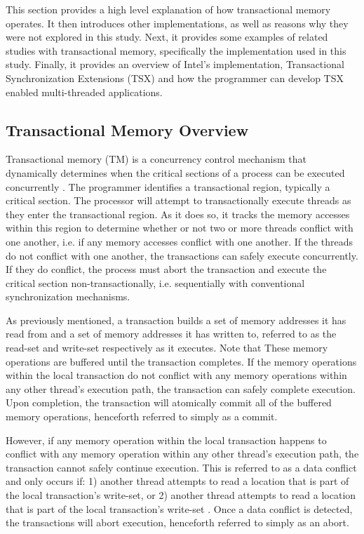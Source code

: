 \documentclass[a4paper]{article}
\begin{document}
\indent 
This section provides a high level explanation of how transactional
memory operates.  It then introduces other implementations, as well as reasons
why they were not explored in this study.  Next, it provides some examples of
related studies with transactional memory, specifically the implementation used
in this study. Finally, it provides an overview of Intel's implementation,
Transactional Synchronization Extensions (TSX) and how the programmer can
develop TSX enabled multi-threaded applications.
\par

\subsection{\textbf{Transactional Memory Overview}}

\indent
Transactional memory (TM) is a concurrency control mechanism that dynamically
determines when the critical sections of a process can be executed concurrently
\cite{sle_rajwar}.  The programmer identifies a transactional region, typically
a critical section.  The processor will attempt to transactionally execute
threads as they enter the transactional region.  As it does so, it tracks the
memory accesses within this region to determine whether or not two or more
threads conflict with one another, i.e. if any memory accesses conflict with one
another.  If the threads do not conflict with one another, the transactions can
safely execute concurrently.  If they do conflict, the process must abort the
transaction and execute the critical section non-transactionally, i.e.
sequentially with conventional synchronization mechanisms. 
\par

\indent 
As previously mentioned, a transaction builds a set of memory addresses it has
read from and a set of memory addresses it has written to, referred to as the
read-set and write-set respectively \cite{intel_prog_ref} as it executes.  Note
that These memory operations are buffered until the transaction completes.  If
the  memory operations within the local transaction do not conflict with any
memory operations within any other thread's execution path, the transaction can
safely complete execution.  Upon completion, the transaction will atomically
commit all of the buffered memory operations, henceforth referred to simply as a
commit.
\par

\indent 
However, if any memory operation within the local transaction happens to  
conflict with any memory operation within any other thread's execution path, the
transaction cannot safely continue execution.  This is referred to as a data
conflict and only occurs if: 1) another thread attempts to read a location that
is part of the local transaction's write-set, or 2) another thread attempts to
read a location that is part of the local transaction's write-set
\cite{intel_prog_ref}.  Once a data conflict is detected, the transactions will
abort execution, henceforth referred to simply as an abort.
\par
\end{document}
